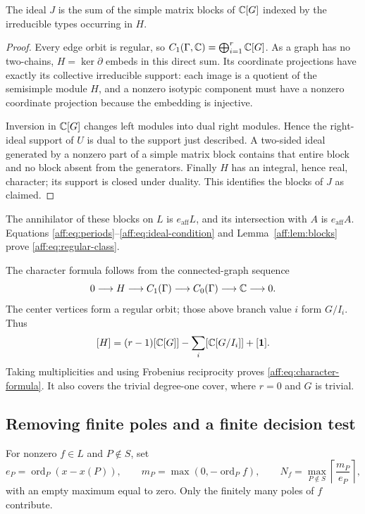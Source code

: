 \begin{lemma}\label{aff:lem:blocks}
The ideal $J$ is the sum of the simple matrix blocks of $\mathbb C[G]$ indexed by
the irreducible types occurring in $H$.
\end{lemma}
\begin{proof}
Every edge orbit is regular, so
$C_1(\Gamma,\mathbb C)=\bigoplus_{i=1}^r\mathbb C[G]$. As a graph has no two-chains,
$H=\ker\partial$ embeds in this direct sum. Its coordinate projections have
exactly its collective irreducible support: each image is a quotient of the
semisimple module $H$, and a nonzero isotypic component must have a nonzero
coordinate projection because the embedding is injective.

Inversion in $\mathbb C[G]$ changes left modules into dual right modules. Hence the
right-ideal support of $U$ is dual to the support just described. A two-sided
ideal generated by a nonzero part of a simple matrix block contains that
entire block and no block absent from the generators. Finally $H$ has an
integral, hence real, character; its support is closed under duality. This
identifies the blocks of $J$ as claimed.
\end{proof}

The annihilator of these blocks on $L$ is $e_{\mathrm{aff}}L$, and its intersection with
$A$ is $e_{\mathrm{aff}}A$. Equations \eqref{aff:eq:periods}--\eqref{aff:eq:ideal-condition}
and Lemma~\ref{aff:lem:blocks} prove \eqref{aff:eq:regular-class}.

The character formula follows from the connected-graph sequence
\[
 0\longrightarrow H\longrightarrow C_1(\Gamma)
  \longrightarrow C_0(\Gamma)\longrightarrow\mathbb C\longrightarrow0.
\]
The center vertices form a regular orbit; those above branch value $i$ form
$G/I_i$. Thus
\[
 [H]=(r-1)[\mathbb C[G]]-\sum_i[\mathbb C[G/I_i]]+[\mathbf1].
\]
Taking multiplicities and using Frobenius reciprocity proves
\eqref{aff:eq:character-formula}. It also covers the trivial degree-one cover,
where $r=0$ and $G$ is trivial.

\subsection{Removing finite poles and a finite decision test}

For nonzero $f\in L$ and $P\notin S$, set
\[
 e_P=\operatorname{ord}_P(x-x(P)),\qquad m_P=\max(0,-\operatorname{ord}_Pf),\qquad
 N_f=\max_{P\notin S}\left\lceil\frac{m_P}{e_P}\right\rceil,
\]
with an empty maximum equal to zero. Only the finitely many poles of $f$
contribute.

